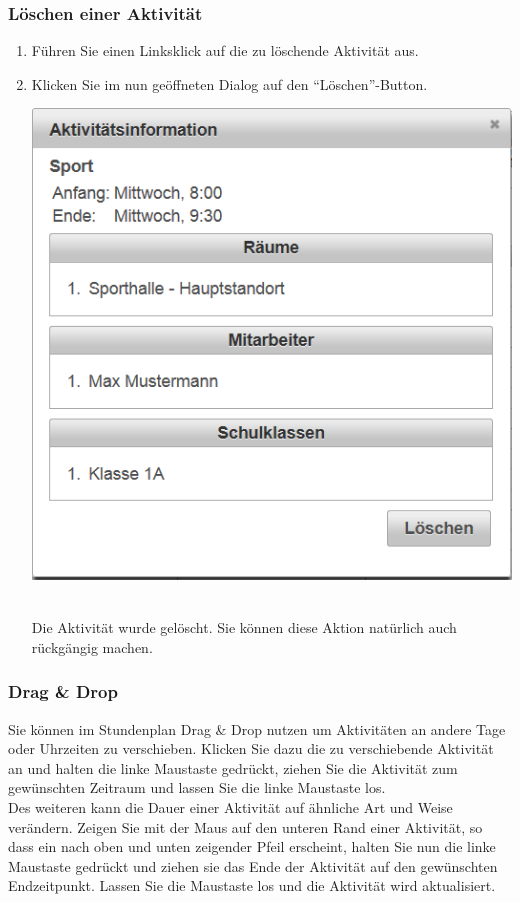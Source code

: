 \documentclass[fontsize=12pt]{scrartcl}
\begin{document}
\subsubsection{Löschen einer Aktivität}
\begin{enumerate}
\item Führen Sie einen Linksklick auf die zu löschende Aktivität aus.
\item Klicken Sie im nun geöffneten Dialog auf den "`Löschen"'-Button. \medskip\\
	\begin{minipage}[t]{\linewidth}
            \includegraphics[width=.5\linewidth]{images/activityInfo.png}
    \end{minipage} 
    \medskip\\
    Die Aktivität wurde gelöscht. Sie können diese Aktion natürlich auch rückgängig machen.
\end{enumerate}

\subsubsection{Drag \& Drop}
Sie können im Stundenplan Drag \& Drop nutzen um Aktivitäten an andere Tage oder Uhrzeiten zu verschieben. Klicken Sie dazu die zu verschiebende Aktivität an und halten die linke Maustaste gedrückt, ziehen Sie die Aktivität zum gewünschten Zeitraum und lassen Sie die linke Maustaste los.\\
Des weiteren kann die Dauer einer Aktivität auf ähnliche Art und Weise verändern. Zeigen Sie mit der Maus auf den unteren Rand einer Aktivität, so dass ein nach oben und unten zeigender Pfeil erscheint, halten Sie nun die linke Maustaste gedrückt und ziehen sie das Ende der Aktivität auf den gewünschten Endzeitpunkt. Lassen Sie die Maustaste los und die Aktivität wird aktualisiert. \\
\end{document}
